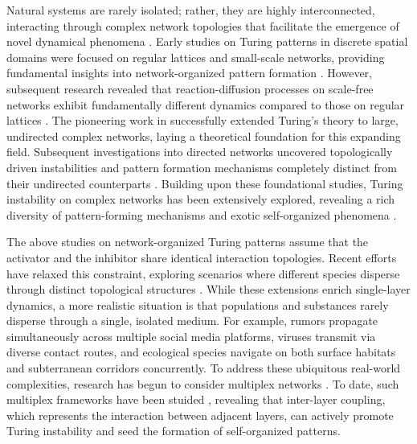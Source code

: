 \documentclass{SCIS2026}
\begin{document}
Natural systems are rarely isolated; rather, they are highly interconnected, interacting through complex network topologies that facilitate the emergence of novel dynamical phenomena \cite{Grilli2017,Sun2017,Jiang2023,Qin2025,Yang2025,Niu2026,Sun2026}.
Early studies on Turing patterns in discrete spatial domains were focused on regular lattices and small-scale networks, providing fundamental insights into network-organized pattern formation \cite{Othmer1971,Othmer1974,Horsthemke2004,Moore2005}.
However, subsequent research revealed that reaction-diffusion processes on scale-free networks exhibit fundamentally different dynamics compared to those on regular lattices \cite{Gallos2004}.
The pioneering work in \cite{Nakao2010} successfully extended Turing's theory to large, undirected complex networks, laying a theoretical foundation for this expanding field.
Subsequent investigations into directed networks uncovered topologically driven instabilities and pattern formation mechanisms completely distinct from their undirected counterparts \cite{Asllani2014}.
Building upon these foundational studies, Turing instability on complex networks has been extensively explored, revealing a rich diversity of pattern-forming mechanisms and exotic self-organized phenomena \cite{Van2023,Li2024,Zheng2023,He2023}.

The above studies on network-organized Turing patterns assume that the activator and the inhibitor share identical interaction topologies.
Recent efforts have relaxed this constraint, exploring scenarios where different species disperse through distinct topological structures \cite{Del2016,Shi2023,Ye2025,Zhao2025_PhysicaA}.
While these extensions enrich single-layer dynamics, a more realistic situation is that populations and substances rarely disperse through a single, isolated medium.
For example, rumors propagate simultaneously across multiple social media platforms, viruses transmit via diverse contact routes, and ecological species navigate on both surface habitats and subterranean corridors concurrently.
To address these ubiquitous real-world complexities, research has begun to consider multiplex networks \cite{Fu2025,Zhao2025_SCIS,Li2022,Gong2024}.
To date, such multiplex frameworks have been stuided \cite{Asllani2014PRE}, revealing that inter-layer coupling, which represents the interaction between adjacent layers, can actively promote Turing instability and seed the formation of self-organized patterns.
\end{document}
